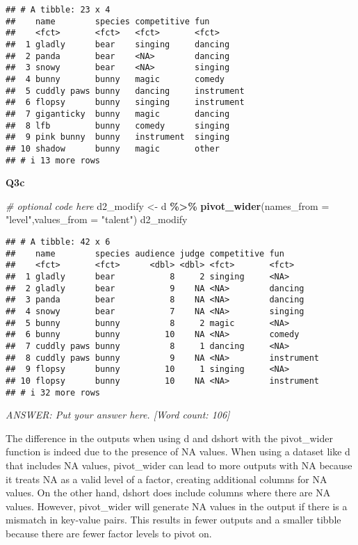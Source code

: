 \documentclass[
]{article}
\newenvironment{Shaded}{\begin{snugshade}}{\end{snugshade}}
\newcommand{\AttributeTok}[1]{\textcolor[rgb]{0.13,0.29,0.53}{#1}}
\newcommand{\CommentTok}[1]{\textcolor[rgb]{0.56,0.35,0.01}{\textit{#1}}}
\newcommand{\FunctionTok}[1]{\textcolor[rgb]{0.13,0.29,0.53}{\textbf{#1}}}
\newcommand{\NormalTok}[1]{#1}
\newcommand{\OtherTok}[1]{\textcolor[rgb]{0.56,0.35,0.01}{#1}}
\newcommand{\SpecialCharTok}[1]{\textcolor[rgb]{0.81,0.36,0.00}{\textbf{#1}}}
\newcommand{\StringTok}[1]{\textcolor[rgb]{0.31,0.60,0.02}{#1}}
\begin{document}
\begin{verbatim}
## # A tibble: 23 x 4
##    name        species competitive fun       
##    <fct>       <fct>   <fct>       <fct>     
##  1 gladly      bear    singing     dancing   
##  2 panda       bear    <NA>        dancing   
##  3 snowy       bear    <NA>        singing   
##  4 bunny       bunny   magic       comedy    
##  5 cuddly paws bunny   dancing     instrument
##  6 flopsy      bunny   singing     instrument
##  7 giganticky  bunny   magic       dancing   
##  8 lfb         bunny   comedy      singing   
##  9 pink bunny  bunny   instrument  singing   
## 10 shadow      bunny   magic       other     
## # i 13 more rows
\end{verbatim}

\textbf{Q3c}

\begin{Shaded}
\begin{Highlighting}[]
\CommentTok{\# optional code here}
\NormalTok{d2\_modify }\OtherTok{\textless{}{-}}\NormalTok{ d }\SpecialCharTok{\%\textgreater{}\%}
  \FunctionTok{pivot\_wider}\NormalTok{(}\AttributeTok{names\_from =} \StringTok{"level"}\NormalTok{,}\AttributeTok{values\_from =} \StringTok{"talent"}\NormalTok{)}
\NormalTok{d2\_modify}
\end{Highlighting}
\end{Shaded}

\begin{verbatim}
## # A tibble: 42 x 6
##    name        species audience judge competitive fun       
##    <fct>       <fct>      <dbl> <dbl> <fct>       <fct>     
##  1 gladly      bear           8     2 singing     <NA>      
##  2 gladly      bear           9    NA <NA>        dancing   
##  3 panda       bear           8    NA <NA>        dancing   
##  4 snowy       bear           7    NA <NA>        singing   
##  5 bunny       bunny          8     2 magic       <NA>      
##  6 bunny       bunny         10    NA <NA>        comedy    
##  7 cuddly paws bunny          8     1 dancing     <NA>      
##  8 cuddly paws bunny          9    NA <NA>        instrument
##  9 flopsy      bunny         10     1 singing     <NA>      
## 10 flopsy      bunny         10    NA <NA>        instrument
## # i 32 more rows
\end{verbatim}

\emph{ANSWER: Put your answer here. {[}Word count: 106{]}}

The difference in the outputs when using d and dshort with the
pivot\_wider function is indeed due to the presence of NA values. When
using a dataset like d that includes NA values, pivot\_wider can lead to
more outputs with NA because it treats NA as a valid level of a factor,
creating additional columns for NA values. On the other hand, dshort
does include columns where there are NA values. However, pivot\_wider
will generate NA values in the output if there is a mismatch in
key-value pairs. This results in fewer outputs and a smaller tibble
because there are fewer factor levels to pivot on.
\end{document}
